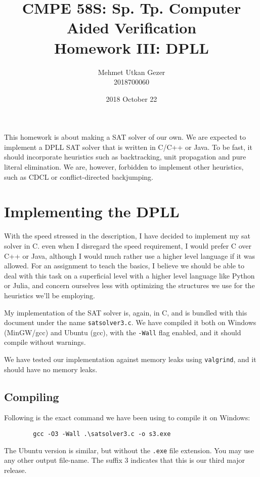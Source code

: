 \documentclass{article}
\title{CMPE 58S: Sp. Tp. Computer Aided Verification \\ Homework III: DPLL}
\date{2018 October 22}
\author{Mehmet Utkan Gezer \\ 2018700060}
\begin{document}
\maketitle

This homework is about making a SAT solver of our own.
We are expected to implement a DPLL SAT solver that is
written in C/C++ or Java. To be fast, it should incorporate
heuristics such as backtracking, unit propagation and
pure literal elimination. We are, however, forbidden to
implement other heuristics, such as CDCL or
conflict-directed backjumping.

\section{Implementing the DPLL}

With the speed stressed in the description, I have decided
to implement my sat solver in C. even when I disregard the
speed requirement, I would prefer C over C++ or Java,
although I would much rather use a higher level language
if it was allowed. For an assignment to teach the basics,
I believe we should be able to deal with this task on a
superficial level with a higher level language like
Python or Julia, and concern ourselves less with optimizing
the structures we use for the heuristics we'll be employing.

My implementation of the SAT solver is, again, in C, and
is bundled with this document under the name
\texttt{satsolver3.c}. We have compiled it both on
Windows (MinGW/gcc) and Ubuntu (gcc), with the
\texttt{-Wall} flag enabled, and it should compile
without warnings.

We have tested our implementation against memory
leaks using \texttt{valgrind}, and it should have no
memory leaks.

\subsection{Compiling}

Following is the exact command we have
been using to compile it on Windows:

\begin{center}
    \begin{verbatim}
        gcc -O3 -Wall .\satsolver3.c -o s3.exe
    \end{verbatim}
\end{center}

The Ubuntu version is similar, but without the \texttt{.exe}
file extension. You may use any other output file-name.
The suffix 3 indicates that this is our third major release.
\end{document}

